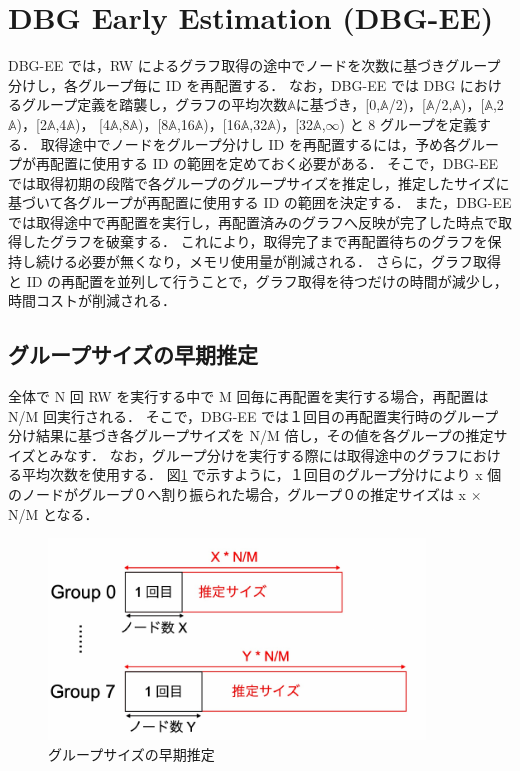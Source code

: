 \section{DBG Early Estimation (DBG-EE)}
DBG-EE では，RW によるグラフ取得の途中でノードを次数に基づきグループ分けし，各グループ毎に ID を再配置する．
なお，DBG-EE では DBG におけるグループ定義を踏襲し，グラフの平均次数$\mathbb{A}$に基づき，[0,$\mathbb{A}$/2)，[$\mathbb{A}$/2,$\mathbb{A}$)，[$\mathbb{A}$,2$\mathbb{A}$)，[2$\mathbb{A}$,4$\mathbb{A}$)，
[4$\mathbb{A}$,8$\mathbb{A}$)，[8$\mathbb{A}$,16$\mathbb{A}$)，[16$\mathbb{A}$,32$\mathbb{A}$)，[32$\mathbb{A}$,$\infty$)
と 8 グループを定義する．
取得途中でノードをグループ分けし ID を再配置するには，予め各グループが再配置に使用する ID の範囲を定めておく必要がある．
そこで，DBG-EE では取得初期の段階で各グループのグループサイズを推定し，推定したサイズに基づいて各グループが再配置に使用する ID の範囲を決定する．
また，DBG-EE では取得途中で再配置を実行し，再配置済みのグラフへ反映が完了した時点で取得したグラフを破棄する．
これにより，取得完了まで再配置待ちのグラフを保持し続ける必要が無くなり，メモリ使用量が削減される．
さらに，グラフ取得と ID の再配置を並列して行うことで，グラフ取得を待つだけの時間が減少し，時間コストが削減される．
\subsection{グループサイズの早期推定}
全体で N 回 RW を実行する中で M 回毎に再配置を実行する場合，再配置は N/M 回実行される．
そこで，DBG-EE では１回目の再配置実行時のグループ分け結果に基づき各グループサイズを N/M 倍し，その値を各グループの推定サイズとみなす．
なお，グループ分けを実行する際には取得途中のグラフにおける平均次数を使用する．
図\ref{estimation_size} で示すように，１回目のグループ分けにより x 個のノードがグループ０へ割り振られた場合，グループ０の推定サイズは x $\times$ N/M となる．

\begin{figure}[t]
  \centering
  \includegraphics[width=10cm]{./figure/estimated_group_size.pdf}
  \caption{グループサイズの早期推定}
  \label{estimation_size}
\end{figure}

